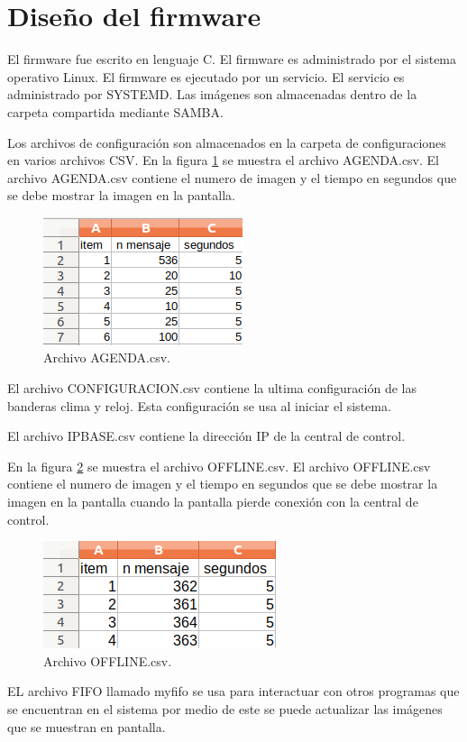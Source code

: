 \section{ Diseño del firmware}
El firmware fue escrito en lenguaje C. El firmware es administrado por el sistema operativo Linux. El firmware es ejecutado por un servicio. El servicio es administrado por SYSTEMD. Las imágenes son almacenadas  dentro de la carpeta compartida mediante SAMBA. 

Los archivos de configuración son almacenados en la carpeta de configuraciones en varios archivos CSV. En la figura \ref{fig:agendacsv} se muestra el archivo AGENDA.csv. El archivo AGENDA.csv contiene el numero de imagen y el tiempo en segundos que se debe mostrar la imagen en la pantalla.

\begin{figure}[htpb]
	\centering
    \includegraphics[scale=0.7]{Figures/Agenda.png} 
	\caption{Archivo AGENDA.csv.}
	\label{fig:agendacsv}
\end{figure}


El archivo CONFIGURACION.csv contiene la ultima configuración de las banderas clima y reloj. Esta configuración se usa al iniciar el sistema.

El archivo IPBASE.csv contiene la dirección IP de la central de control.

En la figura \ref{fig:offlinecsv} se muestra el archivo OFFLINE.csv. El archivo OFFLINE.csv contiene el numero de imagen y el tiempo en segundos que se debe mostrar la imagen en la pantalla cuando la pantalla pierde conexión con la central de control.

\begin{figure}[htpb]
	\centering
	\includegraphics[scale=0.7]{Figures/offline.png} 
	\caption{Archivo OFFLINE.csv.}
	\label{fig:offlinecsv}
\end{figure}
EL archivo FIFO llamado myfifo se usa para interactuar con otros programas que se encuentran en el sistema por medio de este se puede actualizar las imágenes que se muestran en pantalla.


